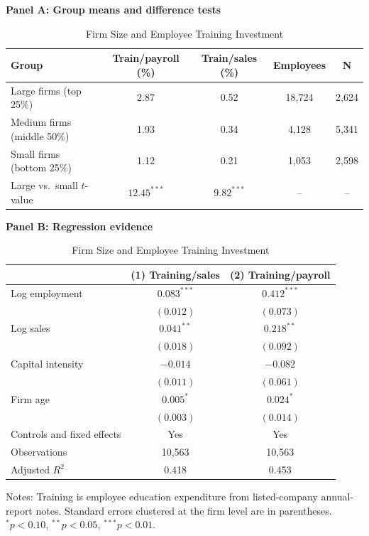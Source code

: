 \documentclass[12pt,a4paper]{article}
\theoremstyle{predstyle}
\theoremstyle{plain}
\begin{document}
\begin{table}[H]
\centering
\caption{Firm Size and Employee Training Investment}
\label{tab:training}
\begin{threeparttable}
\scriptsize
\setlength{\tabcolsep}{4pt}
\textbf{Panel A: Group means and difference tests}
\begin{tabular}{lcccc}
\toprule
Group & Train/payroll (\%) & Train/sales (\%) & Employees & N \\
\midrule
Large firms (top 25\%) & 2.87 & 0.52 & 18,724 & 2,624 \\
Medium firms (middle 50\%) & 1.93 & 0.34 & 4,128 & 5,341 \\
Small firms (bottom 25\%) & 1.12 & 0.21 & 1,053 & 2,598 \\
\midrule
Large vs.\ small \(t\)-value & \(12.45^{***}\) & \(9.82^{***}\) & -- & -- \\
\bottomrule
\end{tabular}

\medskip
\textbf{Panel B: Regression evidence}
\begin{tabular}{lcc}
\toprule
 & (1) Training/sales & (2) Training/payroll \\
\midrule
Log employment & \(0.083^{***}\) & \(0.412^{***}\) \\
 & \((0.012)\) & \((0.073)\) \\
Log sales & \(0.041^{**}\) & \(0.218^{**}\) \\
 & \((0.018)\) & \((0.092)\) \\
Capital intensity & \(-0.014\) & \(-0.082\) \\
 & \((0.011)\) & \((0.061)\) \\
Firm age & \(0.005^{*}\) & \(0.024^{*}\) \\
 & \((0.003)\) & \((0.014)\) \\
Controls and fixed effects & Yes & Yes \\
\midrule
Observations & 10,563 & 10,563 \\
Adjusted \(R^2\) & 0.418 & 0.453 \\
\bottomrule
\end{tabular}
\begin{tablenotes}
\footnotesize
\item Notes: Training is employee education expenditure from listed-company annual-report notes. Standard errors clustered at the firm level are in parentheses. \(^{*}p<0.10\), \(^{**}p<0.05\), \(^{***}p<0.01\).
\end{tablenotes}
\end{threeparttable}
\end{table}
\end{document}

